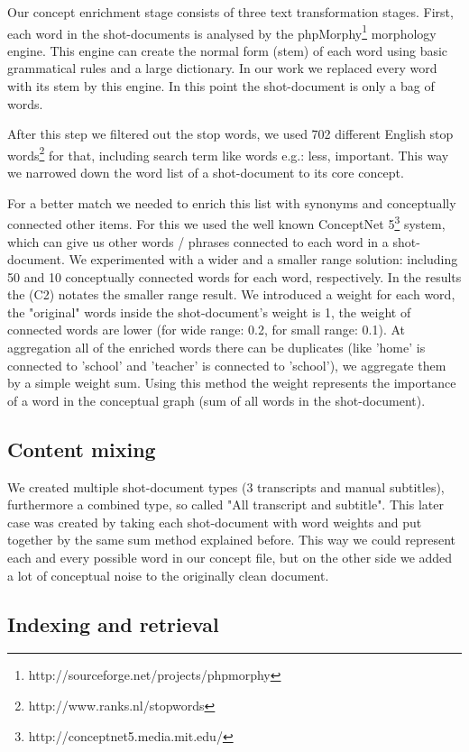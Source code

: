 \documentclass{acm_proc_article-me}
\begin{document}
Our concept enrichment stage consists of three text transformation stages. First, each word in the shot-documents is analysed by the phpMorphy\footnote{http://sourceforge.net/projects/phpmorphy} morphology engine. This engine can create the normal form (stem) of each word using basic grammatical rules and a large dictionary. In our work we replaced every word with its stem by this engine. In this point the shot-document is only a bag of words.

After this step we filtered out the stop words, we used 702 different English stop words\footnote{http://www.ranks.nl/stopwords} for that, including search term like words e.g.: less, important.
This way we narrowed down the word list of a shot-document to its core concept.

For a better match we needed to enrich this list with synonyms and conceptually connected other items. For this we used the well known ConceptNet 5\footnote{http://conceptnet5.media.mit.edu/} system, which can give us other words / phrases connected to each word in a shot-document. We experimented with a wider and a smaller range solution: including 50 and 10 conceptually connected words for each word, respectively. In the results the (C2) notates the smaller range result. We introduced a weight for each word, the "original" words inside the shot-document's weight is 1, the weight of connected words are lower (for wide range: 0.2, for small range: 0.1). At aggregation all of the enriched words there can be duplicates (like 'home' is connected to 'school' and 'teacher' is connected to 'school'), we aggregate them by a simple weight sum. Using this method the weight represents the importance of a word in the conceptual graph (sum of all words in the shot-document).

\subsection{Content mixing}

We created multiple shot-document types (3 transcripts and manual subtitles), furthermore a combined type, so called "All transcript and subtitle". This later case was created by taking each shot-document with word weights and put together by the same sum method explained before. This way we could represent each and every possible word in our concept file, but on the other side we added a lot of conceptual noise to the originally clean document.

\subsection{Indexing and retrieval}
\end{document}
